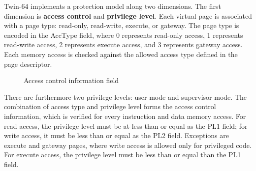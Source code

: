 
Twin-64 implements a protection model along two dimensions. The first dimension is \textbf{access control} and \textbf{privilege level}. Each virtual page is associated with a page type: read-only, read-write, execute, or gateway. The page type is encoded in the AccType field, where 0 represents read-only access, 1 represents read-write access, 2 represents execute access, and 3 represents gateway access. Each memory access is checked against the allowed access type defined in the page descriptor. 

\begin{figure}[H]
\begin{center}
\end{center}
\caption{Access control information field}
\label{fig:Access control information field}
\end{figure}

There are furthermore two privilege levels: user mode and supervisor mode. The combination of access type and privilege level forms the access control information, which is verified for every instruction and data memory access. For read access, the privilege level must be at less than or equal as the PL1 field; for write access, it must be less than or equal as the PL2 field. Exceptions are execute and gateway pages, where write access is allowed only for privileged code. For execute access, the privilege level must be less than or equal than the PL1 field.

